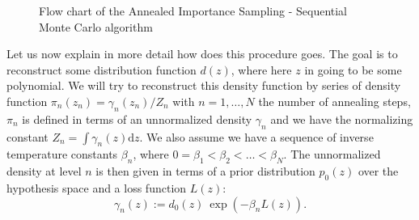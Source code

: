 \documentclass[11pt,a4paper]{article}
\begin{document}
\begin{figure}[h!]
\begin{minipage}{15cm}
\begin{tcolorbox}
				\end{tcolorbox}
			\end{minipage}
			\caption{Flow chart of the Annealed Importance Sampling - Sequential Monte Carlo algorithm}
			\label{ASMCflowchart}
		\end{figure}
		
		
Let us now explain in more detail how does this procedure goes. The goal is to reconstruct some distribution function $d(z)$, where here $z$ in going to be some polynomial. We will try to reconstruct this density function by series of density function $\pi_n(z_n) = \gamma_n(z_n)/Z_n$ with $n = 1,\dots,N$ the number of annealing steps, $\pi_n$ is defined in terms of an unnormalized density $\gamma_n$ and we have the normalizing constant $Z_n = \int \gamma_n(z) \mathrm{d}z$. We also assume we have a sequence of inverse temperature constants $\beta_n$, where $0 = \beta_1 < \beta_2 <\dots< \beta_N$. The unnormalized density at level $n$ is then given in terms of a prior distribution $p_0(z)$ over the hypothesis space and a loss function $L(z)$:
		\begin{equation}\label{eq:gamman}
			\gamma_n(z) := d_0(z) \: \exp \left( -\beta_n L(z) \right).
		\end{equation} 
		
\end{document}
